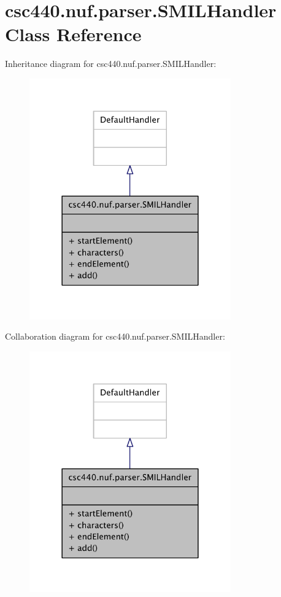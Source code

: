 \hypertarget{classcsc440_1_1nuf_1_1parser_1_1_s_m_i_l_handler}{\section{csc440.\-nuf.\-parser.\-S\-M\-I\-L\-Handler Class Reference}
\label{classcsc440_1_1nuf_1_1parser_1_1_s_m_i_l_handler}
}


Inheritance diagram for csc440.\-nuf.\-parser.\-S\-M\-I\-L\-Handler\-:
\nopagebreak
\begin{figure}[H]
\begin{center}
\leavevmode
\includegraphics[width=246pt]{classcsc440_1_1nuf_1_1parser_1_1_s_m_i_l_handler__inherit__graph}
\end{center}
\end{figure}


Collaboration diagram for csc440.\-nuf.\-parser.\-S\-M\-I\-L\-Handler\-:
\nopagebreak
\begin{figure}[H]
\begin{center}
\leavevmode
\includegraphics[width=246pt]{classcsc440_1_1nuf_1_1parser_1_1_s_m_i_l_handler__coll__graph}
\end{center}
\end{figure}
